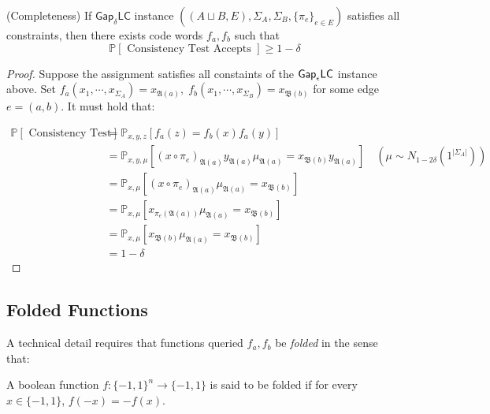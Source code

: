 \begin{proposition} (Completeness)
  If $\mathsf{Gap}_\delta\mathsf{LC}$ instance $((A\sqcup B,E),\Sigma_A,\Sigma_B,\{\pi_e\}_{e \in E})$ satisfies all constraints, then there exists code words $f_a, f_b$ such that
  \begin{equation}
    \mathbb{P}[ \text{ Consistency Test Accepts } ] \geq 1 - \delta
  \end{equation}
\end{proposition}
\begin{proof}
  Suppose the assignment satisfies all constaints of the $\mathsf{Gap}_\epsilon\mathsf{LC}$ instance above. Set $f_a(x_1,\cdots, x_{\Sigma_A}) = x_{\mathfrak{A}(a)}, \; f_b(x_1,\cdots, x_{\Sigma_B}) = x_{\mathfrak{B}(b)}$ for some edge $e=(a,b)$. It must hold that:

  \begin{align*}
      \mathbb{P}[ \text{ Consistency Test Accepts } ] & = \mathbb{P}_{x,y,z}\left[f_a(z) = f_b(x)f_a(y) \right] \\
      & = \mathbb{P}_{x,y, \mu}\left[ (x \circ \pi_e)_{\mathfrak{A}(a)}y_{\mathfrak{A}(a)}\mu_{\mathfrak{A}(a)} = x_{\mathfrak{B}(b)}y_{\mathfrak{A}(a)}  \right] \quad (\mu \sim N_{1 - 2\delta}(1^{|\Sigma_A|})) \\
      & = \mathbb{P}_{x,\mu} \left[(x \circ \pi_e)_{\mathfrak{A}(a)}\mu_{\mathfrak{A}(a)} = x_{\mathfrak{B}(b)} \right] \\
      & =  \mathbb{P}_{x,\mu} \left[x_{\pi_e(\mathfrak{A}(a))}\mu_{\mathfrak{A}(a)} = x_{\mathfrak{B}(b)} \right]\\
      & =  \mathbb{P}_{x,\mu} \left[x_{\mathfrak{B}(b)}\mu_{\mathfrak{A}(a)} = x_{\mathfrak{B}(b)} \right] \\
      & = 1 - \delta
  \end{align*}
\end{proof}
%
%

\subsection{Folded Functions}
A technical detail requires that functions queried $f_a,f_b$ be \emph{folded} in the sense that:
%
\begin{definition}
A boolean function $f:\{-1,1\}^n \rightarrow \{-1,1\}$ is said to be folded if for every $x \in \{-1,1\}$, $f(-x) = -f(x)$.
\end{definition}

